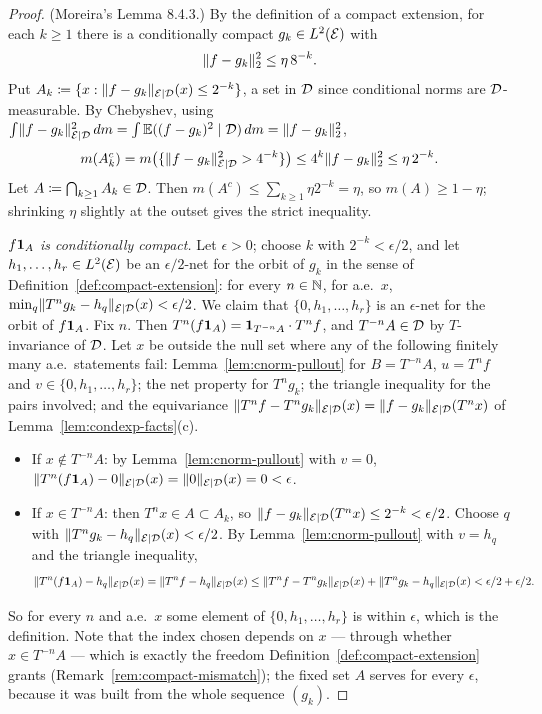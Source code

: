 \begin{proof}
  (Moreira's Lemma 8.4.3.)  By the definition of a compact extension, for each $k \geq 1$ there
  is a conditionally compact $g_k \in L^2(\mathcal{E})$ with
  \begin{equation}
    \label{eq:gk-choice}
    \lVert f - g_k \rVert_2^2 \leq \eta\, 8^{-k} .
  \end{equation}
  Put $A_k \coloneqq \{x : \lVert f - g_k \rVert_{\mathcal{E} \mid \mathcal{D}}(x) \leq 2^{-k}\}$, a set in $\mathcal{D}$ since conditional
  norms are $\mathcal{D}$-measurable.  By Chebyshev, using
  $\int \lVert f-g_k \rVert_{\mathcal{E} \mid \mathcal{D}}^2\,dm = \int \mathbb{E}((f-g_k)^2\mid\mathcal{D})\,dm = \lVert f-g_k \rVert_2^2$,
  \[
    m(A_k^c) = m\bigl(\{ \lVert f-g_k \rVert_{\mathcal{E} \mid \mathcal{D}}^2 > 4^{-k} \}\bigr) \leq 4^k \lVert f-g_k \rVert_2^2 \leq \eta\, 2^{-k} .
  \]
  Let $A \coloneqq \bigcap_{k \geq 1} A_k \in \mathcal{D}$.  Then $m(A^c) \leq \sum_{k\geq1} \eta 2^{-k} = \eta$,
  so $m(A) \geq 1 - \eta$; shrinking $\eta$ slightly at the outset gives the strict inequality.

  \emph{$f\mathbf{1}_A$ is conditionally compact.}  Let $\epsilon > 0$; choose $k$ with
  $2^{-k} < \epsilon/2$, and let $h_1,\dots,h_r \in L^2(\mathcal{E})$ be an $\epsilon/2$-net for the
  orbit of $g_k$ in the sense of Definition~\ref{def:compact-extension}: for every $n \in \mathbb{N}$,
  for a.e.\ $x$, $\min_q \lVert T^ng_k - h_q \rVert_{\mathcal{E} \mid \mathcal{D}}(x) < \epsilon/2$.  We claim that
  $\{0, h_1, \dots, h_r\}$ is an $\epsilon$-net for the orbit of $f\mathbf{1}_A$.  Fix $n$.  Then
  $T^n(f\mathbf{1}_A) = \mathbf{1}_{T^{-n}A}\cdot T^nf$, and $T^{-n}A \in \mathcal{D}$ by $T$-invariance of $\mathcal{D}$.
  Let $x$ be outside the null set where any of the following finitely many a.e.\ statements
  fail: Lemma~\ref{lem:cnorm-pullout} for $B = T^{-n}A$, $u = T^nf$ and $v \in \{0,h_1,\dots,h_r\}$;
  the net property for $T^ng_k$; the triangle inequality for the pairs involved; and the
  equivariance $\lVert T^nf - T^ng_k \rVert_{\mathcal{E} \mid \mathcal{D}}(x) = \lVert f-g_k \rVert_{\mathcal{E} \mid \mathcal{D}}(T^nx)$ of
  Lemma~\ref{lem:condexp-facts}(c).
  \begin{itemize}
    \item If $x \notin T^{-n}A$: by Lemma~\ref{lem:cnorm-pullout} with $v = 0$,
      $\lVert T^n(f\mathbf{1}_A) - 0 \rVert_{\mathcal{E} \mid \mathcal{D}}(x) = \lVert 0 \rVert_{\mathcal{E} \mid \mathcal{D}}(x) = 0 < \epsilon$.
    \item If $x \in T^{-n}A$: then $T^nx \in A \subset A_k$, so
      $\lVert f - g_k \rVert_{\mathcal{E} \mid \mathcal{D}}(T^nx) \leq 2^{-k} < \epsilon/2$.  Choose $q$ with
      $\lVert T^ng_k - h_q \rVert_{\mathcal{E} \mid \mathcal{D}}(x) < \epsilon/2$.  By Lemma~\ref{lem:cnorm-pullout} with $v = h_q$
      and the triangle inequality,
      \[
        \lVert T^n(f\mathbf{1}_A) - h_q \rVert_{\mathcal{E} \mid \mathcal{D}}(x) = \lVert T^nf - h_q \rVert_{\mathcal{E} \mid \mathcal{D}}(x)
          \leq \lVert T^nf - T^ng_k \rVert_{\mathcal{E} \mid \mathcal{D}}(x) + \lVert T^ng_k - h_q \rVert_{\mathcal{E} \mid \mathcal{D}}(x) < \epsilon/2 + \epsilon/2 .
      \]
  \end{itemize}
  So for every $n$ and a.e.\ $x$ some element of $\{0,h_1,\dots,h_r\}$ is within $\epsilon$,
  which is the definition.  Note that the index chosen depends on $x$ --- through whether
  $x \in T^{-n}A$ --- which is exactly the freedom Definition~\ref{def:compact-extension}
  grants (Remark~\ref{rem:compact-mismatch}); the fixed set $A$ serves for every $\epsilon$,
  because it was built from the whole sequence $(g_k)$.
\end{proof}

